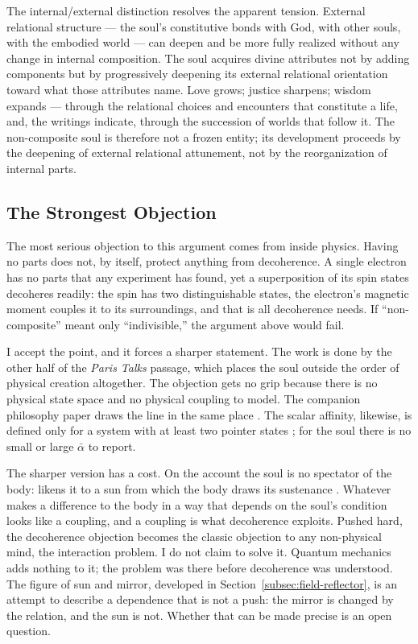 The internal/external distinction resolves the apparent tension. External
relational structure --- the soul's constitutive bonds with God,
with other souls, with the embodied world --- can deepen and be more fully
realized without any change in internal composition. The soul acquires divine
attributes not by adding components but by progressively deepening its external
relational orientation toward what those attributes name. Love grows; justice
sharpens; wisdom expands --- through the relational choices and encounters that
constitute a life, and, the writings indicate, through the succession of worlds
that follow it. The non-composite soul is therefore not a frozen entity; its
development proceeds by the deepening of external relational attunement, not by
the reorganization of internal parts.

\subsection*{The Strongest Objection}

The most serious objection to this argument comes from inside physics. Having
no parts does not, by itself, protect anything from decoherence. A single
electron has no parts that any experiment has found, yet a superposition of its
spin states decoheres readily: the spin has two distinguishable states, the
electron's magnetic moment couples it to its surroundings, and that is all
decoherence needs. If ``non-composite'' meant only ``indivisible,'' the argument
above would fail.

I accept the point, and it forces a sharper statement. The work is done by the
other half of the \textit{Paris Talks} passage, which places the soul outside
the order of physical creation altogether. The objection
gets no grip because there is no physical state space and no physical coupling
to model. The companion philosophy paper draws the line in the same place
\citep{AdamsThreePaths}. The scalar affinity, likewise, is defined only for a
system with at least two pointer states \citep{AdamsRCT}; for the soul there is
no small or large $\bar{\alpha}$ to report.

The sharper version has a cost. On the \bahai account the soul is no spectator
of the body: \Bahaullah likens it to a sun from which the body draws its
sustenance \citep{GleaningsBahaullah}. Whatever makes a difference to the body
in a way that depends on the soul's condition looks like a coupling, and a
coupling is what decoherence exploits. Pushed hard, the decoherence objection
becomes the classic objection to any non-physical mind, the interaction problem.
I do not claim to solve it. Quantum mechanics adds nothing to it; the problem
was there before decoherence was understood. The figure of sun and mirror,
developed in Section~\ref{subsec:field-reflector}, is an attempt to describe a
dependence that is not a push: the mirror is changed by the relation, and the
sun is not. Whether that can be made precise is an open question.

